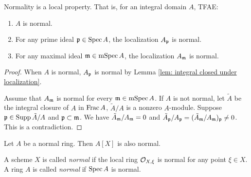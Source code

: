     \begin{proposition}\label{prop: normality is a local property}
        Normality is a local property. 
        That is, for an integral domain $A$, TFAE:
        \begin{enumerate}[label=(\roman*)]
            \item $A$ is normal.
            \item For any prime ideal ${\mathfrak{p}} \in \operatorname{Spec} A$, the localization $A_{\mathfrak{p}}$ is normal.
            \item For any maximal ideal ${\mathfrak{m}} \in \operatorname{mSpec} A$, the localization $A_{\mathfrak{m}}$ is normal.
        \end{enumerate}
    \end{proposition}
    \begin{proof}
        When $A$ is normal, $A_{\mathfrak{p}}$ is normal by Lemma \ref{lem: integral closed under localization}.

        Assume that $A_{\mathfrak{m}}$ is normal for every ${\mathfrak{m}} \in \operatorname{mSpec} A$.
        If $A$ is not normal, let $\tilde{A}$ be the integral closure of $A$ in $\operatorname{Frac} A$, $\tilde{A}/A$ is a nonzero $A$-module.
        Suppose ${\mathfrak{p}} \in \operatorname{Supp} \tilde{A}/A$ and ${\mathfrak{p}} \subset {\mathfrak{m}}$.
        We have $\tilde{A}_{\mathfrak{m}}/A_{\mathfrak{m}} = 0$ and $\tilde{A}_{\mathfrak{p}}/A_{\mathfrak{p}} = (\tilde{A}_{\mathfrak{m}}/A_{\mathfrak{m}})_{\mathfrak{p}} \neq 0$.
        This is a contradiction.
    \end{proof}

    \begin{proposition}
        Let $A$ be a normal ring.
        Then $A[X]$ is also normal.
    \end{proposition}

    \begin{definition}\label{def: normal of scheme and general ring}
        A scheme $X$ is called \textit{normal} if the local ring ${\mathcal{O}}_{X,\xi}$ is normal for any point $\xi \in X$.
        A ring $A$ is called \textit{normal} if $\operatorname{Spec} A$ is normal.
    \end{definition}


